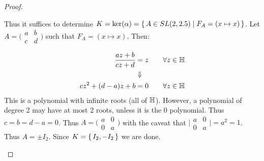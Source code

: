 \begin{proof}
\begin{enumerate}
    
    Thus it suffices to determine $K = \ker ( \alpha) = \set{A \in SL(2,2.5) \mid F_A = (x \mapsto x)}$. Let $A= \big(\begin{smallmatrix}
  a & b\\
  c & d
\end{smallmatrix}\big)$ such that $F_A = (x \mapsto x)$. Then:

\begin{align*}
    \frac{az + b}{cz + d} &= z \qquad \forall z \in \mathbb{H}\\
    &\Downarrow\\
    cz^2 + (d-a) z + b &= 0 \qquad \forall z \in \mathbb{H}
\end{align*}
This is a polynomial with infinite roots (all of $\mathbb{H}$). However, a polynomial of degree 2 may have at most 2 roots, unless it is the 0 polynomial. Thus $c = b = d-a = 0$. Thus $A= \big(\begin{smallmatrix}
  a & 0\\
  0 & a
\end{smallmatrix}\big)$ with the caveat that $ \big|\begin{smallmatrix}
  a & 0\\
  0 & a
\end{smallmatrix}\big|   = a^2 = 1$. Thus $A = \pm I_2$. Since $K = \set{ I_2, -I_2}$ we are done.
\end{enumerate}


\end{proof}


